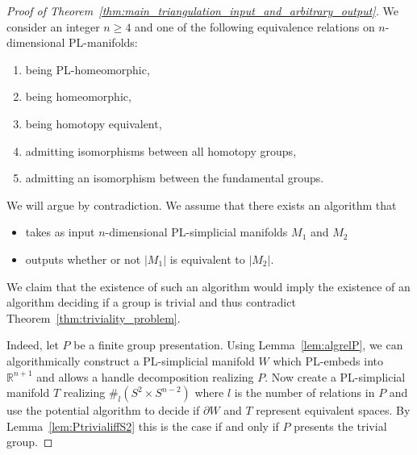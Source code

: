 \documentclass[a4paper, reqno]{amsart}
\theoremstyle{definition}
\theoremstyle{remark}
\newcommand{\R}{\mathbb{R}}
\newcommand{\ttimes}{\mathbin{%
    \ooalign{\raise1.15ex\hbox{$\scriptstyle\sim$}\cr\hidewidth$\times$\hidewidth\cr}%
    }}
\renewcommand{\~}{\nobreak\ }
\begin{document}
\begin{proof}[Proof of Theorem\~\ref{thm:main_triangulation_input_and_arbitrary_output}]
We consider an integer $n\geq 4$ and one of the following equivalence relations on $n$-dimensional PL-manifolds:
\begin{enumerate}
    \item being PL-homeomorphic,
    \item being homeomorphic,
    \item being homotopy equivalent,
    \item admitting isomorphisms between all homotopy groups,
    \item admitting an isomorphism between the fundamental groups.
\end{enumerate}
We will argue by contradiction. We assume that there exists an algorithm that
\begin{itemize}
    \item takes as input $n$-dimensional PL-simplicial manifolds $M_1$ and $M_2$ %
    \item outputs whether or not $|M_1|$ is equivalent to $|M_2|$.
\end{itemize}
We claim that the existence of such an algorithm would imply the existence of an algorithm deciding if a group is trivial and thus contradict Theorem\~\ref{thm:triviality_problem}. 

Indeed, let $P$ be a finite group presentation. Using Lemma\~\ref{lem:algrelP}, we can algorithmically construct a PL-simplicial manifold $W$ which PL-embeds into $\R^{n+1}$ and allows a handle decomposition realizing $P$. Now create a PL-simplicial manifold $T$ realizing $\#_l(S^2 \times S^{n-2})$ where $l$ is the number of relations in $P$ and use the potential algorithm to decide if $\partial W$ and $T$ represent equivalent spaces. By Lemma\~\ref{lem:PtrivialiffS2} this is the case if and only if $P$ presents the trivial group.
%
\end{proof}
\end{document}
